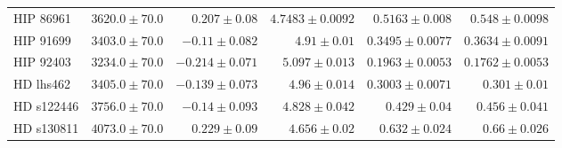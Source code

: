 \begin{longtable*}{lrrrrr}
HIP 86961 & $3620.0\pm 70.0$ & $0.207\pm 0.08$ & $4.7483\pm 0.0092$ & $0.5163\pm 0.008$ & $0.548\pm 0.0098$ \\ 
HIP 91699 & $3403.0\pm 70.0$ & $-0.11\pm 0.082$ & $4.91\pm 0.01$ & $0.3495\pm 0.0077$ & $0.3634\pm 0.0091$ \\ 
HIP 92403 & $3234.0\pm 70.0$ & $-0.214\pm 0.071$ & $5.097\pm 0.013$ & $0.1963\pm 0.0053$ & $0.1762\pm 0.0053$ \\ 
HD lhs462 & $3405.0\pm 70.0$ & $-0.139\pm 0.073$ & $4.96\pm 0.014$ & $0.3003\pm 0.0071$ & $0.301\pm 0.01$ \\ 
HD s122446 & $3756.0\pm 70.0$ & $-0.14\pm 0.093$ & $4.828\pm 0.042$ & $0.429\pm 0.04$ & $0.456\pm 0.041$ \\ 
HD s130811 & $4073.0\pm 70.0$ & $0.229\pm 0.09$ & $4.656\pm 0.02$ & $0.632\pm 0.024$ & $0.66\pm 0.026$ \\ 
\bottomrule 
\end{longtable*} 
